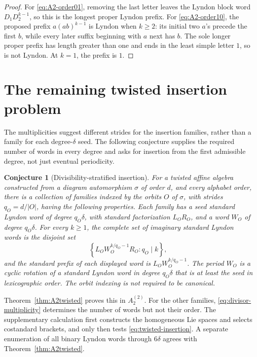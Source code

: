 \documentclass[11pt]{amsart}
\numberwithin{equation}{section}
\newtheorem{conjecture}[theorem]{Conjecture}
\theoremstyle{definition}
\begin{document}
\begin{proof}
For \eqref{eq:A2-order01}, removing the last letter leaves the Lyndon block word $D_1D_2^{k-1}$, so this is the longest proper Lyndon prefix. For \eqref{eq:A2-order10}, the proposed prefix $a(ab)^{k-1}$ is Lyndon when $k\geq2$: its initial two $a$'s precede the first $b$, while every later suffix beginning with $a$ next has $b$. The sole longer proper prefix has length greater than one and ends in the least simple letter $1$, so is not Lyndon. At $k=1$, the prefix is $1$.
\end{proof}

\section{The remaining twisted insertion problem}\label{sec:conjecture}

The multiplicities suggest different strides for the insertion families, rather than a family for each degree-$\delta$ seed. The following conjecture supplies the required number of words in every degree and asks for insertion from the first admissible degree, not just eventual periodicity.

\begin{conjecture}[Divisibility-stratified insertion]\label{conj:twisted-insertion}
For a twisted affine algebra constructed from a diagram automorphism $\sigma$ of order $d$, and every alphabet order, there is a collection of families indexed by the orbits $O$ of $\sigma$, with strides $q_O=d/|O|$, having the following properties. Each family has a seed standard Lyndon word of degree $q_O\delta$, with standard factorization $L_OR_O$, and a word $W_O$ of degree $q_O\delta$. For every $k\geq1$, the complete set of imaginary standard Lyndon words is the disjoint set
\begin{equation}\label{eq:twisted-insertion}
 \left\{L_OW_O^{k/q_O-1}R_O:q_O\mid k\right\},
\end{equation}
and the standard prefix of each displayed word is $L_OW_O^{k/q_O-1}$. The period $W_O$ is a cyclic rotation of a standard Lyndon word in degree $q_O\delta$ that is at least the seed in lexicographic order. The orbit indexing is not required to be canonical.
\end{conjecture}

Theorem~\ref{thm:A2twisted} proves this in $A_2^{(2)}$. For the other families, \eqref{eq:divisor-multiplicity} determines the number of words but not their order. The supplementary calculation first constructs the homogeneous Lie spaces and selects costandard brackets, and only then tests \eqref{eq:twisted-insertion}. A separate enumeration of all binary Lyndon words through $6\delta$ agrees with Theorem~\ref{thm:A2twisted}.
\end{document}
